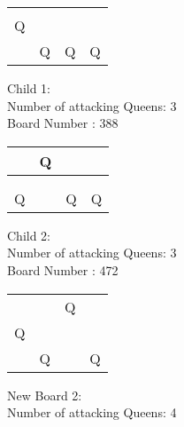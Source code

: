 \documentclass[a4paper,10pt]{article}
\begin{document}
\begin{flushleft}
\begin{flushleft}
\begin{flushleft}
\begin{flushleft}
\begin{flushleft}
\begin{flushleft}
\begin{flushleft}
\begin{flushleft}
\begin{flushleft}
\begin{flushleft}
\begin{flushleft}
\begin{flushleft}
    \begin{tabular}{| l | l | l | l |}
    \hline
     & & & \\ \hline
     & & & \\ \hline
     Q & & & \\ \hline
     & Q & Q & Q \\ \hline
    \end{tabular}
\begin{flushleft}
Child 1:\\
Number of attacking Queens: 3 \\
Board Number : 388 \\
\vspace{5mm}
    \begin{tabular}{| l | l | l | l |}
    \hline
     & Q & & \\ \hline
     & & & \\ \hline
     & & & \\ \hline
     Q & & Q & Q \\ \hline
    \end{tabular}
\begin{flushleft}
Child 2:\\
Number of attacking Queens: 3 \\
Board Number : 472 \\
\vspace{5mm}
    \begin{tabular}{| l | l | l | l |}
    \hline
     & & & \\ \hline
     & & Q & \\ \hline
     Q & & & \\ \hline
     & Q & & Q \\ \hline
    \end{tabular}
\begin{flushleft}
New Board 2: \\
Number of attacking Queens: 4\\
\vspace{5mm}


\end{flushleft}
\end{flushleft}
\end{flushleft}
\end{flushleft}
\end{flushleft}
\end{flushleft}
\end{flushleft}
\end{flushleft}
\end{flushleft}
\end{flushleft}
\end{flushleft}
\end{flushleft}
\end{flushleft}
\end{flushleft}
\end{flushleft}
\end{document}
